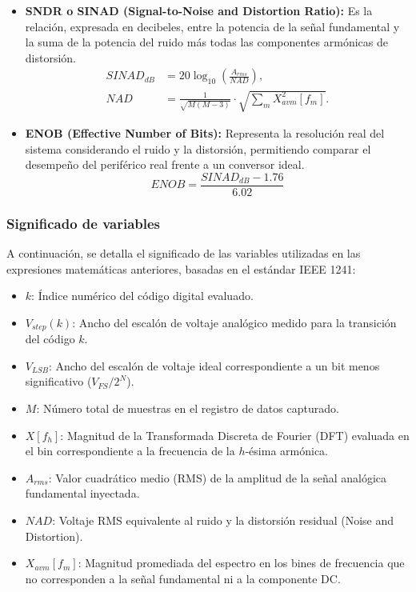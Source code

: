 \documentclass{article}
\begin{document}
\begin{itemize}
    \begin{equation}
        THD=\frac{\sqrt{\frac{1}{M^2}\sum_{h} |X[f_h]|^2}}{A_{rms}}.
    \end{equation}
    \item \textbf{SNDR o SINAD (Signal-to-Noise and Distortion Ratio):} Es la relación, expresada en decibeles, entre la potencia de la señal fundamental y la suma de la potencia del ruido más todas las componentes armónicas de distorsión.
    \begin{align}
        SINAD_{dB}&= 20 \log_{10}\left( \frac{A_{rms}}{NAD} \right),\\
    NAD&=\frac{1}{\sqrt{M(M-3)}}\cdot\sqrt{\sum_mX_{avm}^2[f_m]}\nonumber .
    \end{align}
    \item \textbf{ENOB (Effective Number of Bits):} Representa la resolución real del sistema considerando el ruido y la distorsión, permitiendo comparar el desempeño del periférico real frente a un conversor ideal.
    \begin{equation}
        ENOB=\frac{SINAD_{dB}-1.76}{6.02}
    \end{equation}
\end{itemize} \vspace{-2mm}
\subsubsection{Significado de variables}
A continuación, se detalla el significado de las variables utilizadas en las expresiones matemáticas anteriores, basadas en el estándar IEEE 1241:
\begin{itemize}
    \item $k$: Índice numérico del código digital evaluado.
    \item $V_{step}(k)$: Ancho del escalón de voltaje analógico medido para la transición del código $k$.
    \item $V_{LSB}$: Ancho del escalón de voltaje ideal correspondiente a un bit menos significativo ($V_{FS}/2^N$).
    \item $M$: Número total de muestras en el registro de datos capturado.
    \item $X[f_h]$: Magnitud de la Transformada Discreta de Fourier (DFT) evaluada en el bin correspondiente a la frecuencia de la $h$-ésima armónica.
    \item $A_{rms}$: Valor cuadrático medio (RMS) de la amplitud de la señal analógica fundamental inyectada.
    \item $NAD$: Voltaje RMS equivalente al ruido y la distorsión residual (Noise and Distortion).
    \item $X_{avm}[f_m]$: Magnitud promediada del espectro en los bines de frecuencia que no corresponden a la señal fundamental ni a la componente DC.
\end{itemize}
\end{document}
